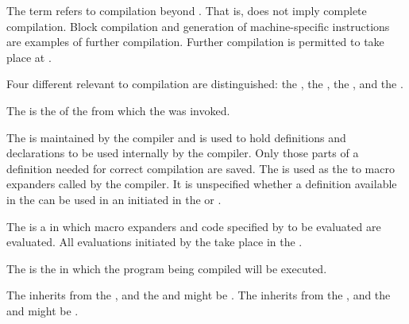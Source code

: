 The term  refers to
 compilation beyond .
That is,  does not imply complete compilation.
Block compilation and generation of machine-specific instructions are 
examples of further compilation.
Further compilation is permitted to take place at .

Four different  relevant to compilation are
distinguished:
  the ,
  the ,
  the , and
  the .

The  is
the  of the  
from which the  was invoked.

The  is maintained by the compiler
and is used to hold definitions and declarations to be used internally
by the compiler.  Only those parts of a definition needed for correct
compilation are saved. The  is used
as the   to macro expanders called by
the compiler. It is unspecified whether a definition available in the
 can be used in an 
initiated in the  or .

The  is a 
in which macro expanders and code specified by 
to be evaluated are evaluated.  All evaluations initiated by the
 take place in the .

The  is the 
 in which the program being compiled will be executed.

The  inherits from
the ,
and the  and  
might be .
The  inherits from
the , 
and the  and  
might be .


